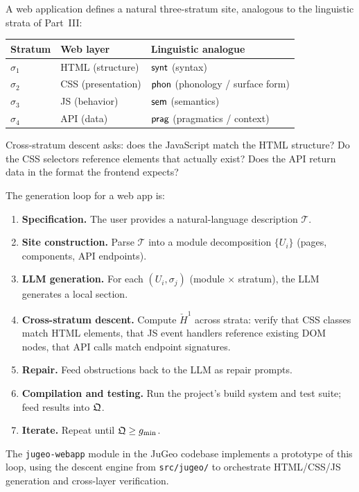 \begin{example}
\label{ex:webapp-site}
A web application defines a natural three-stratum site, analogous to
the linguistic strata of Part~III:
\begin{center}
\begin{tabular}{lll}
\textbf{Stratum} & \textbf{Web layer} & \textbf{Linguistic analogue} \\
\hline
$\sigma_1$ & HTML (structure) & $\mathsf{synt}$ (syntax) \\
$\sigma_2$ & CSS (presentation) & $\mathsf{phon}$ (phonology / surface form) \\
$\sigma_3$ & JS (behavior) & $\mathsf{sem}$ (semantics) \\
$\sigma_4$ & API (data) & $\mathsf{prag}$ (pragmatics / context)
\end{tabular}
\end{center}
Cross-stratum descent asks: does the JavaScript match the HTML
structure?  Do the CSS selectors reference elements that actually
exist?  Does the API return data in the format the frontend expects?
\end{example}

The generation loop for a web app is:
\begin{enumerate}
  \item \textbf{Specification.}\;  The user provides a natural-language
        description $\mathcal{T}$.
  \item \textbf{Site construction.}\;  Parse $\mathcal{T}$ into a
        module decomposition $\{U_i\}$ (pages, components, API
        endpoints).
  \item \textbf{LLM generation.}\;  For each $(U_i, \sigma_j)$
        (module $\times$ stratum), the LLM generates a local section.
  \item \textbf{Cross-stratum descent.}\;  Compute
        $\check{H}^1$ across strata: verify that CSS classes match
        HTML elements, that JS event handlers reference existing DOM
        nodes, that API calls match endpoint signatures.
  \item \textbf{Repair.}\;  Feed obstructions back to the LLM as
        repair prompts.
  \item \textbf{Compilation and testing.}\;  Run the project's build
        system and test suite; feed results into $\mathfrak{Q}$.
  \item \textbf{Iterate.}\;  Repeat until $\mathfrak{Q} \geq g_{\min}$.
\end{enumerate}

\begin{remark}
The \texttt{jugeo-webapp} module in the JuGeo codebase implements
a prototype of this loop, using the descent engine from
\texttt{src/jugeo/} to orchestrate HTML/CSS/JS generation and
cross-layer verification.
\end{remark}

